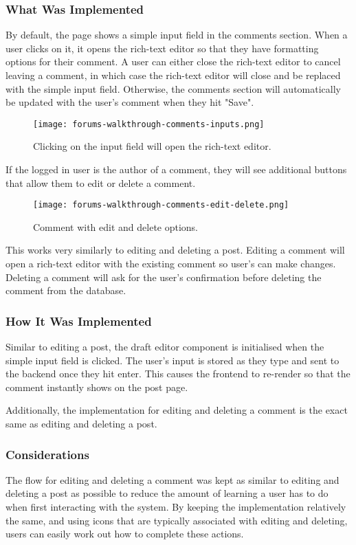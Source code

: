\subsubsection{What Was Implemented}
By default, the page shows a simple input field in the comments section.
When a user clicks on it, it opens the rich-text editor so that they have formatting options for their comment.
A user can either close the rich-text editor to cancel leaving a comment, in which case the rich-text editor will close and be replaced with the simple input field.
Otherwise, the comments section will automatically be updated with the user's comment when they hit "Save".

\begin{figure}[h!]
    \texttt{[image: forums-walkthrough-comments-inputs.png]}
    \centering
    \caption{Clicking on the input field will open the rich-text editor.}
\end{figure}

If the logged in user is the author of a comment, they will see additional buttons that allow them to edit or delete a comment.

\begin{figure}[h!]
    \texttt{[image: forums-walkthrough-comments-edit-delete.png]}
    \centering
    \caption{Comment with edit and delete options.}
\end{figure}

This works very similarly to editing and deleting a post.
Editing a comment will open a rich-text editor with the existing comment so user's can make changes.
Deleting a comment will ask for the user's confirmation before deleting the comment from the database.

\subsubsection{How It Was Implemented}
Similar to editing a post, the draft editor component is initialised when the simple input field is clicked.
The user's input is stored as they type and sent to the backend once they hit enter.
This causes the frontend to re-render so that the comment instantly shows on the post page.

Additionally, the implementation for editing and deleting a comment is the exact same as editing and deleting a post.

\subsubsection{Considerations}
The flow for editing and deleting a comment was kept as similar to editing and deleting a post as possible to reduce the amount of learning a user has to do when first interacting with the system.
By keeping the implementation relatively the same, and using icons that are typically associated with editing and deleting, users can easily work out how to complete these actions.

